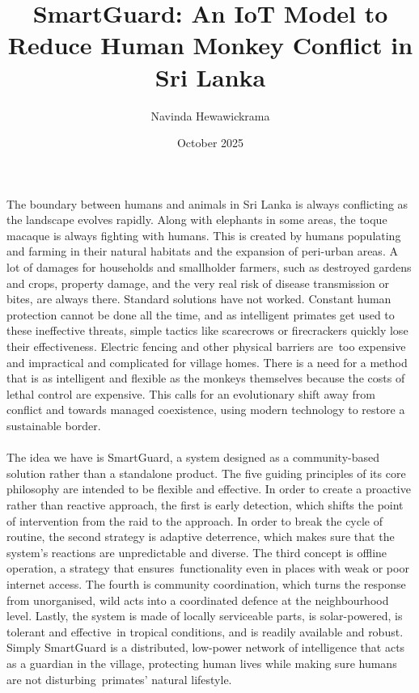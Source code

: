 \documentclass{article}
\title{SmartGuard: An IoT Model to Reduce Human Monkey Conflict in Sri Lanka}
\author{Navinda Hewawickrama}
\date{October 2025}
\begin{document}
\maketitle
The boundary between humans and animals in Sri Lanka is always conflicting as the landscape evolves rapidly. Along with elephants in some areas, the toque macaque is always fighting with humans. This is created by humans populating and farming in their natural habitats and the expansion of peri-urban areas. A lot of damages for households and smallholder farmers, such as destroyed gardens and crops, property damage, and the very real risk of disease transmission or bites, are always there. Standard solutions have not worked. Constant human protection cannot be done all the time, and as intelligent primates get used to these ineffective threats, simple tactics like scarecrows or firecrackers quickly lose their effectiveness. Electric fencing and other physical barriers are too expensive and impractical and complicated for village homes.  There is a need for a method that is as intelligent and flexible as the monkeys themselves because the costs of lethal control are expensive. This calls for an evolutionary shift away from conflict and towards managed coexistence, using modern technology to restore a sustainable border.
\\ \\
The idea we have is SmartGuard, a system designed as a community-based solution rather than a standalone product.  The five guiding principles of its core philosophy are intended to be flexible and effective.  In order to create a proactive rather than reactive approach, the first is early detection, which shifts the point of intervention from the raid to the approach.  In order to break the cycle of routine, the second strategy is adaptive deterrence, which makes sure that the system's reactions are unpredictable and diverse. The third concept is offline operation, a strategy that ensures functionality even in places with weak or poor internet access.  The fourth is community coordination, which turns the response from unorganised, wild acts into a coordinated defence at the neighbourhood level.  Lastly, the system is made of locally serviceable parts, is solar-powered, is tolerant and effective in tropical conditions, and is readily available and robust.  Simply SmartGuard is a distributed, low-power network of intelligence that acts as a guardian in the village, protecting human lives while making sure humans are not disturbing primates' natural lifestyle.
\\ \\
\end{document}
